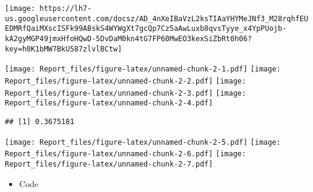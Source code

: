 \documentclass[
]{article}
\providecommand{\tightlist}{%
  \setlength{\itemsep}{0pt}\setlength{\parskip}{0pt}}
\begin{document}
\texttt{[image: https://lh7-us.googleusercontent.com/docsz/AD\_4nXeIBaVzL2ksTIAaYHYMeJNf3\_M28rqhfEUEDMRfQaiMXscISFk99ABskS4WYWgXt7gcQp7Cz5aAwLuxb8qvsTyye\_x4YpPUojb-kA2gyMGP49jmxHfoHQwD-5DvDaM0kn4tG7FP60MwEO3kexSiZbRt0h06?key=h0K1bMW7BkU587zlvlBCtw]}

\texttt{[image: Report\_files/figure-latex/unnamed-chunk-2-1.pdf]}
\texttt{[image: Report\_files/figure-latex/unnamed-chunk-2-2.pdf]}
\texttt{[image: Report\_files/figure-latex/unnamed-chunk-2-3.pdf]}
\texttt{[image: Report\_files/figure-latex/unnamed-chunk-2-4.pdf]}

\begin{verbatim}
## [1] 0.3675181
\end{verbatim}

\texttt{[image: Report\_files/figure-latex/unnamed-chunk-2-5.pdf]}
\texttt{[image: Report\_files/figure-latex/unnamed-chunk-2-6.pdf]}
\texttt{[image: Report\_files/figure-latex/unnamed-chunk-2-7.pdf]}

\begin{itemize}
\tightlist
\item
  Code
\end{itemize}
\end{document}
